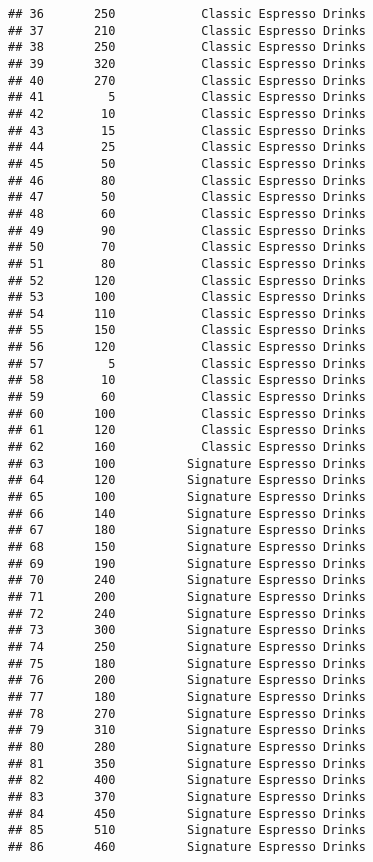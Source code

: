 \documentclass[
]{article}
\begin{document}
\begin{verbatim}
## 36       250            Classic Espresso Drinks
## 37       210            Classic Espresso Drinks
## 38       250            Classic Espresso Drinks
## 39       320            Classic Espresso Drinks
## 40       270            Classic Espresso Drinks
## 41         5            Classic Espresso Drinks
## 42        10            Classic Espresso Drinks
## 43        15            Classic Espresso Drinks
## 44        25            Classic Espresso Drinks
## 45        50            Classic Espresso Drinks
## 46        80            Classic Espresso Drinks
## 47        50            Classic Espresso Drinks
## 48        60            Classic Espresso Drinks
## 49        90            Classic Espresso Drinks
## 50        70            Classic Espresso Drinks
## 51        80            Classic Espresso Drinks
## 52       120            Classic Espresso Drinks
## 53       100            Classic Espresso Drinks
## 54       110            Classic Espresso Drinks
## 55       150            Classic Espresso Drinks
## 56       120            Classic Espresso Drinks
## 57         5            Classic Espresso Drinks
## 58        10            Classic Espresso Drinks
## 59        60            Classic Espresso Drinks
## 60       100            Classic Espresso Drinks
## 61       120            Classic Espresso Drinks
## 62       160            Classic Espresso Drinks
## 63       100          Signature Espresso Drinks
## 64       120          Signature Espresso Drinks
## 65       100          Signature Espresso Drinks
## 66       140          Signature Espresso Drinks
## 67       180          Signature Espresso Drinks
## 68       150          Signature Espresso Drinks
## 69       190          Signature Espresso Drinks
## 70       240          Signature Espresso Drinks
## 71       200          Signature Espresso Drinks
## 72       240          Signature Espresso Drinks
## 73       300          Signature Espresso Drinks
## 74       250          Signature Espresso Drinks
## 75       180          Signature Espresso Drinks
## 76       200          Signature Espresso Drinks
## 77       180          Signature Espresso Drinks
## 78       270          Signature Espresso Drinks
## 79       310          Signature Espresso Drinks
## 80       280          Signature Espresso Drinks
## 81       350          Signature Espresso Drinks
## 82       400          Signature Espresso Drinks
## 83       370          Signature Espresso Drinks
## 84       450          Signature Espresso Drinks
## 85       510          Signature Espresso Drinks
## 86       460          Signature Espresso Drinks

\end{verbatim}
\end{document}
